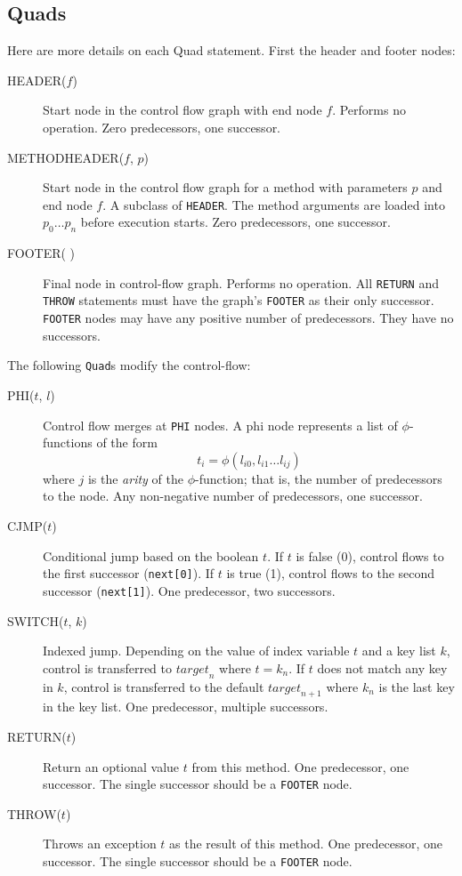 \documentclass[11pt,notitlepage,twocolumn,twoside]{article}
\newcommand{\phifunction}{$\phi$-function}
\begin{document}
\subsection{Quads}
Here are more details on each Quad statement.  First the header and
footer nodes:
\begin{description}
%
\item[HEADER($f$)] Start node in the control flow graph with end node $f$.
Performs no operation.  Zero predecessors, one successor.
%
\item[METHODHEADER($f$, $p$)] Start node in the control flow graph for
a method with parameters $p$ and end node $f$.  A subclass of \texttt{HEADER}.
The method arguments are loaded into $p_0 \ldots p_n$ before execution starts.
Zero predecessors, one successor.
%
\item[FOOTER( )] Final node in control-flow graph.  Performs no operation.
All \texttt{RETURN} and \texttt{THROW} statements must have the graph's
\texttt{FOOTER} as their only successor.  \texttt{FOOTER} nodes may
have any positive number of predecessors.  They have no successors.
\end{description}
%
The following \texttt{Quad}s modify the control-flow:
\begin{description}
%
\item[PHI($t$, $l$)] Control flow merges at \texttt{PHI} nodes.
A phi node represents a list of \phifunction{s} of the form
\[ t_i = \phi(l_{i0}, l_{i1} \ldots l_{ij}) \]
where $j$ is the \textit{arity} of the \phifunction; that is, 
the number of predecessors to the node.  Any non-negative number of
predecessors, one successor.
%
\item[CJMP($t$)] Conditional jump based on the boolean $t$.  If $t$ is
false (0), control flows to the first successor (\texttt{next[0]}).
If $t$ is true (1), control flows to the second successor
(\texttt{next[1]}).  One predecessor, two successors.
%
\item[SWITCH($t$, $k$)] Indexed jump.  Depending on the value of index
variable $t$ and a key list $k$, control is transferred to 
${target}_n$ where $t = k_n$.  If $t$ does not match any key in $k$,
control is transferred to the default ${target}_{n+1}$ where $k_n$ is
the last key in the key list.  One predecessor, multiple successors.
%
\item[RETURN($t$)] Return an optional value $t$ from this method.
One predecessor, one successor.  The single successor should be a
\texttt{FOOTER} node.
%
\item[THROW($t$)] Throws an exception $t$ as the result of this method.
One predecessor, one successor.  The single successor should be a
\texttt{FOOTER} node.
\end{description}
\end{document}
